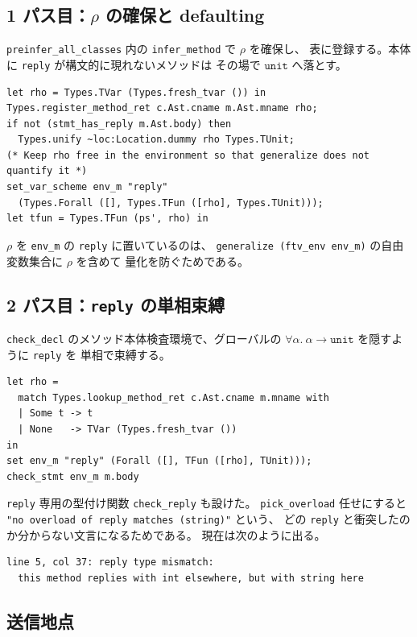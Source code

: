 \documentclass[11pt,a4paper]{ltjsarticle}
\theoremstyle{definition}
\theoremstyle{remark}
\newcommand{\ty}[1]{\ensuremath{\mathtt{#1}}}
\begin{document}
\subsection{1 パス目：$\rho$ の確保と defaulting}

\texttt{preinfer\_all\_classes} 内の \texttt{infer\_method} で $\rho$ を確保し、
表に登録する。本体に \texttt{reply} が構文的に現れないメソッドは
その場で \ty{unit} へ落とす。

\begin{lstlisting}
let rho = Types.TVar (Types.fresh_tvar ()) in
Types.register_method_ret c.Ast.cname m.Ast.mname rho;
if not (stmt_has_reply m.Ast.body) then
  Types.unify ~loc:Location.dummy rho Types.TUnit;
(* Keep rho free in the environment so that generalize does not quantify it *)
set_var_scheme env_m "reply"
  (Types.Forall ([], Types.TFun ([rho], Types.TUnit)));
let tfun = Types.TFun (ps', rho) in
\end{lstlisting}

$\rho$ を \texttt{env\_m} の \texttt{reply} に置いているのは、
\texttt{generalize (ftv\_env env\_m)} の自由変数集合に $\rho$ を含めて
量化を防ぐためである。

\subsection{2 パス目：\texttt{reply} の単相束縛}

\texttt{check\_decl} のメソッド本体検査環境で、グローバルの
$\forall\alpha.\ \alpha \to \ty{unit}$ を隠すように \texttt{reply} を
単相で束縛する。

\begin{lstlisting}
let rho =
  match Types.lookup_method_ret c.Ast.cname m.mname with
  | Some t -> t
  | None   -> TVar (Types.fresh_tvar ())
in
set env_m "reply" (Forall ([], TFun ([rho], TUnit)));
check_stmt env_m m.body
\end{lstlisting}

\texttt{reply} 専用の型付け関数 \texttt{check\_reply} も設けた。
\texttt{pick\_overload} 任せにすると
\texttt{"no overload of reply matches (string)"} という、
どの \texttt{reply} と衝突したのか分からない文言になるためである。
現在は次のように出る。

\begin{lstlisting}[language={}]
line 5, col 37: reply type mismatch:
  this method replies with int elsewhere, but with string here
\end{lstlisting}

\subsection{送信地点}
\end{document}
